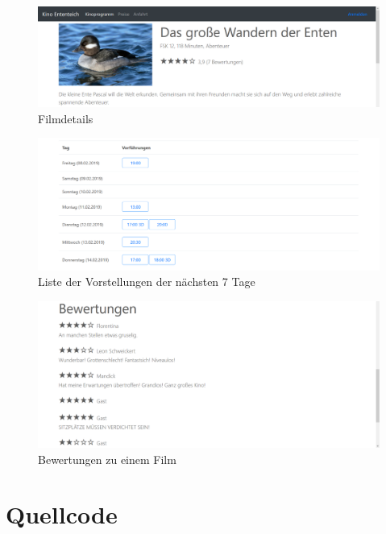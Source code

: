 \begin{figure}[ht]
	\centering
	\includegraphics[width=\textwidth]{img/screenshots/film02a}
	\captionsetup{format=hang}
	\caption{Filmdetails}
	\label{fig:film02a}
\end{figure}

\begin{figure}[ht]
	\centering
	\includegraphics[width=\textwidth]{img/screenshots/film03}
	\captionsetup{format=hang}
	\caption{Liste der Vorstellungen der nächsten 7 Tage}
	\label{fig:film03}
\end{figure}

\begin{figure}[!t]
	\centering
	\includegraphics[width=\textwidth]{img/screenshots/film04}
	\captionsetup{format=hang}
	\caption{Bewertungen zu einem Film}
	\label{fig:film04}
\end{figure}

\chapter{Quellcode}


